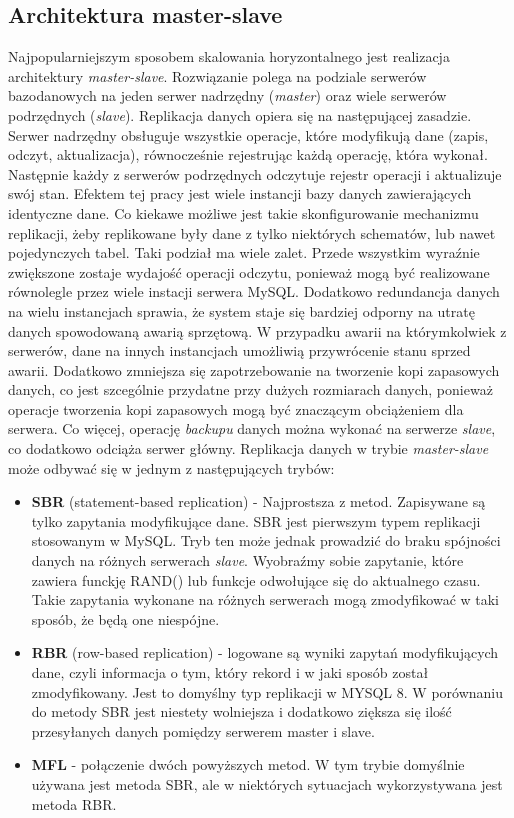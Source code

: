 \subsection{Architektura master-slave}
Najpopularniejszym sposobem skalowania horyzontalnego jest realizacja architektury \textit{master-slave}. Rozwiązanie polega na podziale serwerów bazodanowych na jeden serwer nadrzędny (\textit{master}) oraz wiele serwerów podrzędnych (\textit{slave}). Replikacja danych opiera się na następującej zasadzie. Serwer nadrzędny obsługuje wszystkie operacje, które modyfikują dane (zapis, odczyt, aktualizacja), równocześnie rejestrując każdą operację, która wykonał. Następnie każdy z serwerów podrzędnych odczytuje rejestr operacji i aktualizuje swój stan. Efektem tej pracy jest wiele instancji bazy danych zawierających identyczne dane. Co kiekawe możliwe jest takie skonfigurowanie mechanizmu replikacji, żeby replikowane były dane z tylko niektórych schematów, lub nawet pojedynczych tabel.
Taki podział ma wiele zalet. Przede wszystkim wyraźnie zwiększone zostaje wydajość operacji odczytu, ponieważ mogą być realizowane równolegle przez wiele instacji serwera MySQL. Dodatkowo redundancja danych na wielu instancjach sprawia, że system staje się bardziej odporny na utratę danych spowodowaną awarią sprzętową. W przypadku awarii na którymkolwiek z serwerów, dane na innych instancjach umożliwią przywrócenie stanu sprzed awarii. Dodatkowo zmniejsza się zapotrzebowanie na tworzenie kopi zapasowych danych, co jest szcególnie przydatne przy dużych rozmiarach danych, ponieważ operacje tworzenia kopi zapasowych mogą być znaczącym obciążeniem dla serwera. Co więcej, operację \textit{backupu} danych można wykonać na serwerze \textit{slave}, co dodatkowo odciąża serwer główny. Replikacja danych w trybie \textit{master-slave} może odbywać się w jednym z następujących trybów:
\begin{itemize}
 	\item \textbf{SBR} (statement-based replication) - Najprostsza z metod. Zapisywane są tylko zapytania modyfikujące dane. SBR jest pierwszym typem replikacji stosowanym w MySQL. Tryb ten może jednak prowadzić do braku spójności danych na różnych serwerach \textit{slave}. Wyobraźmy sobie zapytanie, które zawiera funckję RAND() lub funkcje odwołujące się do aktualnego czasu. Takie zapytania wykonane na różnych serwerach mogą zmodyfikować w taki sposób, że będą one niespójne.
	\item \textbf{RBR} (row-based replication) - logowane są wyniki zapytań modyfikujących dane, czyli informacja o tym, który rekord i w jaki sposób został zmodyfikowany. Jest to domyślny typ replikacji w MYSQL 8. W porównaniu do metody SBR jest niestety wolniejsza i dodatkowo ziększa się ilość przesyłanych danych pomiędzy serwerem master i slave.
	\item \textbf{MFL} - połączenie dwóch powyższych metod. W tym trybie domyślnie używana jest metoda SBR, ale w niektórych sytuacjach wykorzystywana jest metoda RBR.
\end{itemize}

